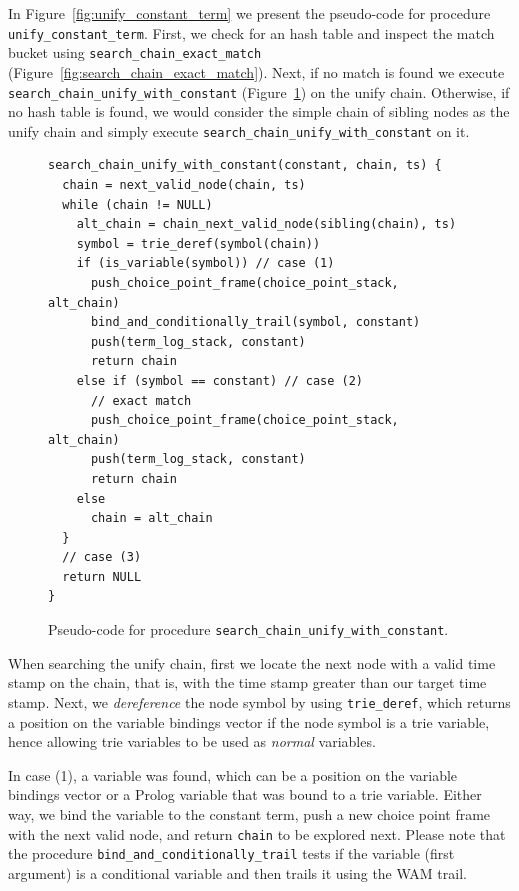 In Figure~\ref{fig:unify_constant_term} we present the pseudo-code for procedure
\texttt{unify\_constant\_term}. First, we check for an hash table and inspect the match
bucket using \texttt{search\_chain\_exact\_match} (Figure~\ref{fig:search_chain_exact_match}).
Next, if no match is found we execute \texttt{search\_chain\_unify\_with\_constant}
(Figure~\ref{fig:search_chain_unify_with_constant}) on the unify chain. Otherwise, if no hash table
is found, we would consider the simple chain of sibling nodes as the unify chain and simply
execute \texttt{search\_chain\_unify\_with\_constant} on it.

\begin{figure}[ht]
\begin{Verbatim}
search_chain_unify_with_constant(constant, chain, ts) {
  chain = next_valid_node(chain, ts)
  while (chain != NULL)
    alt_chain = chain_next_valid_node(sibling(chain), ts)
    symbol = trie_deref(symbol(chain))
    if (is_variable(symbol)) // case (1)
      push_choice_point_frame(choice_point_stack, alt_chain)
      bind_and_conditionally_trail(symbol, constant)
      push(term_log_stack, constant)
      return chain
    else if (symbol == constant) // case (2)
      // exact match
      push_choice_point_frame(choice_point_stack, alt_chain)
      push(term_log_stack, constant)
      return chain
    else
      chain = alt_chain
  }
  // case (3)
  return NULL
}
\end{Verbatim}
\caption{Pseudo-code for procedure \texttt{search\_chain\_unify\_with\_constant}.}
\label{fig:search_chain_unify_with_constant}
\end{figure}

When searching the unify chain, first we locate the next node with a valid time stamp on the chain, that is,
with the time stamp greater than our target time stamp. Next, we \textit{dereference} the node symbol by using
\texttt{trie\_deref}, which returns a position on the variable bindings vector if the node symbol
is a trie variable, hence allowing trie variables to be used as \textit{normal} variables.

In case (1), a variable was found, which can be a position on the variable bindings vector or a Prolog
variable that was bound to a trie variable. Either way, we bind the variable to the constant term,
push a new choice point frame with the next valid node, and return \texttt{chain} to be explored next.
Please note that the procedure \texttt{bind\_and\_conditionally\_trail} tests if the variable (first argument)
is a conditional variable and then trails it using the WAM trail.

